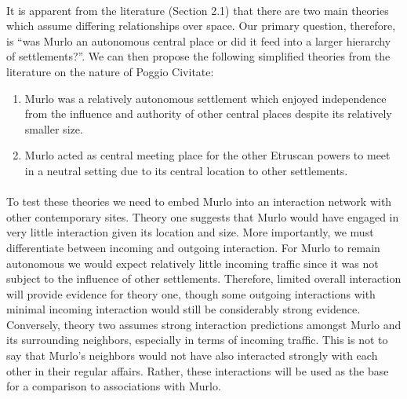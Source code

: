 \documentclass[12pt,a4paper]{thesis}
\begin{document}
\paragraph{}
It is apparent from the literature (Section 2.1) that there are two main theories which assume differing relationships over space. Our primary question, therefore, is ``was Murlo an autonomous central place or did it feed into a larger hierarchy of settlements?''. We can then propose the following simplified theories from the literature on the nature of Poggio Civitate:
	
	\begin{enumerate}
	\item Murlo was a relatively autonomous settlement which enjoyed independence from the influence and authority of other central places despite its relatively smaller size.
	\item Murlo acted as central meeting place for the other Etruscan powers to meet in a neutral setting due to its central location to other settlements. 
	\end{enumerate}

\paragraph{}
To test these theories we need to embed Murlo into an interaction network with other contemporary sites. Theory one suggests that Murlo would have engaged in very little interaction given its location and size. More importantly, we must differentiate between incoming and outgoing interaction. For Murlo to remain autonomous we would expect relatively little incoming traffic since it was not subject to the influence of other settlements. Therefore, limited overall interaction will provide evidence for theory one, though some outgoing interactions with minimal incoming interaction would still be considerably strong evidence. Conversely, theory two assumes strong interaction predictions amongst Murlo and its surrounding neighbors, especially in terms of incoming traffic. This is not to say that Murlo's neighbors would not have also interacted strongly with each other in their regular affairs. Rather, these interactions will be used as the base for a comparison to associations with Murlo.
\end{document}

